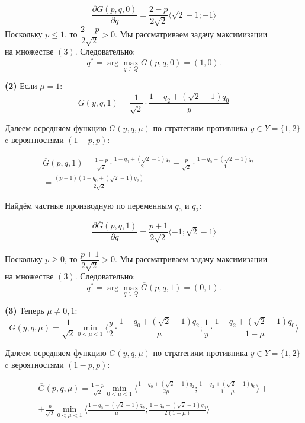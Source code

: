 \begin{flushleft}
	$$
		\frac{\partial \overline G(p,q,0)}{\partial q}
		=\frac{2-p}{2\sqrt{2}} \langle \sqrt{2}-1;-1\rangle
	$$
	Поскольку $p \leqslant 1$, то $\dfrac{2-p}{2\sqrt{2}} > 0 $.
	Мы рассматриваем задачу максимизации \\ на множестве $(3)$.
	Следовательно:
	$$q^* = \arg \max \limits_{q \in Q} \overline G(p,q,0)=(1,0).$$

	
	\textbf{(2)} Если $\mu=1:$
	$$
		G(y,q,1)=\frac{1}{\sqrt{2}}\cdot \frac{1-q_2+(\sqrt{2}-1)q_0}{y}
	$$	
	
	Далеем осредняем функцию $G(y,q,\mu)$ по стратегиям 
	противника $y \in Y=\{1,2\}$ c вероятностями $(1-p,p)$:
	
	\begin{gather*}
		\overline G(p,q,1)=
		\frac{1-p}{\sqrt{2}} \cdot \frac{1-q_0+(\sqrt{2}-1)q_2}{2}+
		\frac{p}{\sqrt{2}} \cdot \frac{1-q_0+(\sqrt{2}-1)q_2}{1}=\\
		=\frac{(p+1)(1-q_0+(\sqrt{2}-1)q_2)}{2\sqrt{2}}
	\end{gather*}
	
	Найдём частные производную по переменным $q_0$ и $q_2$:	
	
	$$
		\frac{\partial \overline G(p,q,1)}{\partial q}
		=\frac{p+1}{2\sqrt{2}} \langle -1; \sqrt{2}-1\rangle
	$$
	
	Поскольку $p \geqslant 0$, то $\dfrac{p+1}{2\sqrt{2}} > 0 $.
	Мы рассматриваем задачу максимизации \\ на множестве $(3)$.
	Следовательно:
	$$q^* = \arg \max \limits_{q\in Q} \overline G(p,q,1)=(0,1).$$

		
	\textbf{(3)} Теперь $\mu \neq 0,1$:
	$$
		G(y,q,\mu)=\frac{1}{\sqrt{2}}\min \limits_{0<\mu<1}
		\big \langle
			\frac{y}{2} \cdot \frac{1-q_0+(\sqrt{2}-1)q_2}{\mu};
			\frac{1}{y} \cdot \frac{1-q_2+(\sqrt{2}-1)q_0}{1-\mu}
		\big \rangle	
	$$

	Далеем осредняем функцию $G(y,q,\mu)$ по стратегиям 
	противника $y \in Y=\{1,2\}$ c вероятностями $(1-p,p)$:

	\begin{multline}\label{eq:G_aver}
		\overline G(p,q,\mu)=\frac{1-p}{\sqrt{2}}\min \limits_{0<\mu<1}
		\big \langle
			\frac{1-q_0+(\sqrt{2}-1)q_2}{2\mu};
			\frac{1-q_2+(\sqrt{2}-1)q_0}{1-\mu}
		\big \rangle + \\
		+\frac{p}{\sqrt{2}}\min \limits_{0<\mu<1}
		\big \langle
			\frac{1-q_0+(\sqrt{2}-1)q_2}{\mu};
			\frac{1-q_2+(\sqrt{2}-1)q_0}{2(1-\mu)}
		\big \rangle 
	\end{multline}
	

\end{flushleft}
